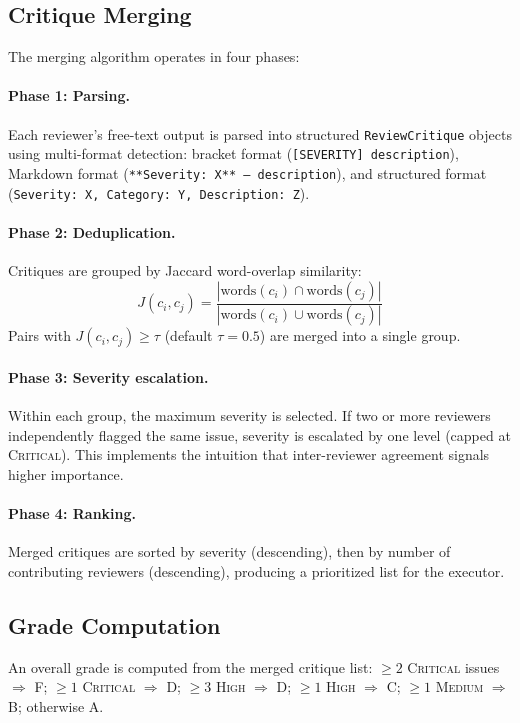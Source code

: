 \documentclass[11pt,a4paper]{article}
\begin{document}
\subsection{Critique Merging}
\label{sec:merge}

The merging algorithm operates in four phases:

\paragraph{Phase 1: Parsing.}
Each reviewer's free-text output is parsed into structured \texttt{ReviewCritique} objects using multi-format detection: bracket format (\texttt{[SEVERITY] description}), Markdown format (\texttt{**Severity: X** --- description}), and structured format (\texttt{Severity: X, Category: Y, Description: Z}).

\paragraph{Phase 2: Deduplication.}
Critiques are grouped by Jaccard word-overlap similarity:
\begin{equation}
J(c_i, c_j) = \frac{|\text{words}(c_i) \cap \text{words}(c_j)|}{|\text{words}(c_i) \cup \text{words}(c_j)|}
\end{equation}
Pairs with $J(c_i, c_j) \geq \tau$ (default $\tau{=}0.5$) are merged into a single group.

\paragraph{Phase 3: Severity escalation.}
Within each group, the maximum severity is selected.
If two or more reviewers independently flagged the same issue, severity is escalated by one level (capped at \textsc{Critical}).
This implements the intuition that inter-reviewer agreement signals higher importance.

\paragraph{Phase 4: Ranking.}
Merged critiques are sorted by severity (descending), then by number of contributing reviewers (descending), producing a prioritized list for the executor.

\subsection{Grade Computation}
An overall grade is computed from the merged critique list:
$\geq 2$ \textsc{Critical} issues $\Rightarrow$ F;
$\geq 1$ \textsc{Critical} $\Rightarrow$ D;
$\geq 3$ \textsc{High} $\Rightarrow$ D;
$\geq 1$ \textsc{High} $\Rightarrow$ C;
$\geq 1$ \textsc{Medium} $\Rightarrow$ B;
otherwise A.
\end{document}
